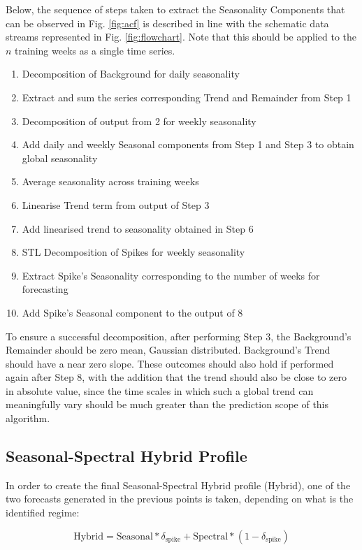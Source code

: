\documentclass[letterpaper, 10 pt, conference]{ieeeconf}  %
\begin{document}
Below, the sequence of steps taken to extract the Seasonality Components that can be observed in Fig. \ref{fig:acf} is described in line with the schematic data streams represented in Fig. \ref{fig:flowchart}. 
Note that this should be applied to the $n$ training weeks as a single time series.
\begin{enumerate}
	\item Decomposition of Background for daily seasonality
	\item Extract and sum the series corresponding Trend and Remainder from Step 1
	\item Decomposition of output from 2 for weekly seasonality
	\item Add daily and weekly Seasonal components from Step 1 and Step 3 to obtain global seasonality
	\item Average seasonality across training weeks
	\item Linearise Trend term from output of Step 3
	\item Add linearised trend to seasonality obtained in Step 6
	\item STL Decomposition of Spikes for weekly seasonality
	\item Extract Spike's Seasonality corresponding to the number of weeks for forecasting
	\item Add Spike's Seasonal component to the output of 8
\end{enumerate}
To ensure a successful decomposition, after performing Step 3, the Background's Remainder should be zero mean, Gaussian distributed. Background's Trend should have a near zero slope. These outcomes should also hold if performed again after Step 8, with the addition that the trend should also be close to zero in absolute value, since the time scales in which such a global trend can meaningfully vary should be much greater than the prediction scope of this algorithm.
\subsection{Seasonal-Spectral Hybrid Profile}
In order to create the final Seasonal-Spectral Hybrid profile (Hybrid), one of the two forecasts generated in the previous points is taken, depending on what is the identified regime: 

\begin{equation}
\textrm{Hybrid} = \textrm{Seasonal} * \delta_{\textrm{spike}} + \textrm{Spectral} * (1 - \delta_{\textrm{spike}})
\end{equation}
\end{document}
